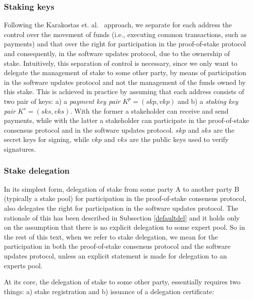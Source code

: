 \documentclass[11pt,a4paper]{article}
\begin{document}
\subsubsection{Staking keys}
\label{sec:staking-keys}

Following the Karakostas et. al.~\cite{stakepools} approach, we separate for
each address the control over the movement of funds (i.e., executing common
transactions, such as payments) and that over the right for participation in the
proof-of-stake protocol and consequently, in the software updates protocol, due
to the ownership of stake.
%
Intuitively, this separation of control is necessary, since we only want to
delegate the management of stake to some other party, by means of participation
in the software updates protocol and not the management of the funds owned by
this stake. This is achieved in practice by assuming that each address consists
of two pair of keys: a) a \emph{payment key pair} $K^p = (skp,vkp)$ and b) a
\emph{staking key pair} $K^s = (sks, vks)$. With the former a stakeholder can
receive and send payments, while with the latter a stakeholder can participate
in the proof-of-stake consensus protocol and in the software updates protocol.
$skp$ and $sks$ are the secret keys for signing, while $vkp$ and $vks$ are the
public keys used to verify signatures.

\subsubsection{Stake delegation}
\label{sec:stake-delegation}

In its simplest form, delegation of stake from some party A to another party B
(typically a stake pool) for participation in the proof-of-stake consensus
protocol, also delegates the right for participation in the software updates
protocol.
%
The rationale of this has been described in Subsection \ref{defaultdel} and it
holds only on the assumption that there is no explicit delegation to some expert
pool. So in the rest of this text, when we refer to stake delegation, we mean
for the participation in both the proof-of-stake consensus protocol and the
software updates protocol, unless an explicit statement is made for delegation
to an experts pool.

At its core, the delegation of stake to some other party, essentially requires
two things: a) stake registration and b) issuance of a delegation certificate:
\end{document}

